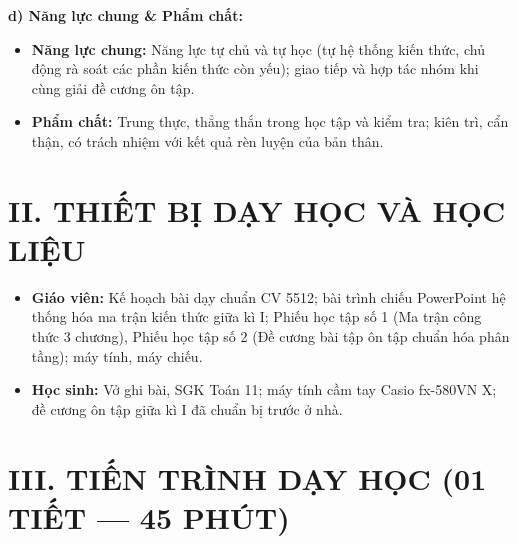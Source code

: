 \documentclass[12pt, a4paper]{article}
\begin{document}
\textbf{d) Năng lực chung \& Phẩm chất:}
\begin{itemize}[leftmargin=1.5em]
    \item \textbf{Năng lực chung:} Năng lực tự chủ và tự học (tự hệ thống kiến thức, chủ động rà soát các phần kiến thức còn yếu); giao tiếp và hợp tác nhóm khi cùng giải đề cương ôn tập.
    \item \textbf{Phẩm chất:} Trung thực, thẳng thắn trong học tập và kiểm tra; kiên trì, cẩn thận, có trách nhiệm với kết quả rèn luyện của bản thân.
\end{itemize}

\section*{II. THIẾT BỊ DẠY HỌC VÀ HỌC LIỆU}
\begin{itemize}[leftmargin=1.5em]
    \item \textbf{Giáo viên:} Kế hoạch bài dạy chuẩn CV 5512; bài trình chiếu PowerPoint hệ thống hóa ma trận kiến thức giữa kì I; Phiếu học tập số 1 (Ma trận công thức 3 chương), Phiếu học tập số 2 (Đề cương bài tập ôn tập chuẩn hóa phân tầng); máy tính, máy chiếu.
    \item \textbf{Học sinh:} Vở ghi bài, SGK Toán 11; máy tính cầm tay Casio fx-580VN X; đề cương ôn tập giữa kì I đã chuẩn bị trước ở nhà.
\end{itemize}

\section*{III. TIẾN TRÌNH DẠY HỌC (01 TIẾT --- 45 PHÚT)}

\begin{center}
\end{center}
\end{document}

